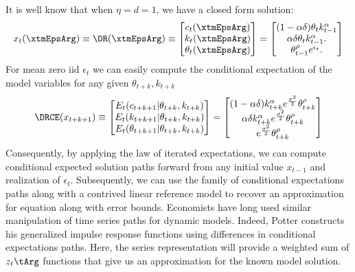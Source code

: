 \documentclass[12pt]{article}
\begin{document}
It is well know that when $\eta=d=1$, we have a closed form solution\citep{lettau03}:
\begin{gather}
x_t(\xtmEpsArg)\equiv    \DR(\xtmEpsArg)\equiv
   \begin{bmatrix}
     c_t(\xtmEpsArg)\\k_t(\xtmEpsArg)\\ \theta_t(\xtmEpsArg)
   \end{bmatrix}=
   \begin{bmatrix}
(1-\alpha \delta) \theta_{t} k_{t-1}^\alpha\\
  \alpha \delta \theta_{t} k_{t-1}^\alpha.\label{soln}\\
\theta_{t-1}^\rho e^{\epsilon_t}.
   \end{bmatrix}
\end{gather}
For mean zero iid $\epsilon_t$ we can easily 
compute the conditional expectation of the model variables for any given $\theta_{t+k},k_{t+k}$
\begin{gather*}
  \DRCE(x_{t+k+1})\equiv
  \begin{bmatrix}
  E_t(c_{t+k+1}|\theta_{t+k},k_{t+k})\\
  E_t(k_{t+k+1}|\theta_{t+k},k_{t+k})\\
  E_t(\theta_{t+k+1}|\theta_{t+k},k_{t+k})
  \end{bmatrix}=
  \begin{bmatrix}
(1-\alpha\delta)k_{t+k}^\alpha e^{\frac{\sigma^2}{2}}\theta_{t+k}^\rho\\
\alpha\delta k_{t+k}^\alpha e^{\frac{\sigma^2}{2}}\theta_{t+k}^\rho\\
e^{\frac{\sigma^2}{2}}\theta_{t+k}^\rho
  \end{bmatrix}
\end{gather*}
Consequently, by applying the law of iterated expectations, we can compute conditional expected solution paths forward from any initial value $x_{t-1}$
and realization of $\epsilon_t$.
Subsequently, we can use the family of conditional expectations paths 
along with a contrived linear reference model to recover an 
approximation for equation  along with error bounds.
Economists have long used similar manipulation of
time series paths for dynamic models. 
Indeed, Potter constructs his generalized impulse response functions using
differences in conditional expectations paths.\cite{Potter2000,Koop1996a}
Here, the series representation will provide a weighted sum of $z_t\tArg$ functions that give us an approximation for the known model solution.
\end{document}
